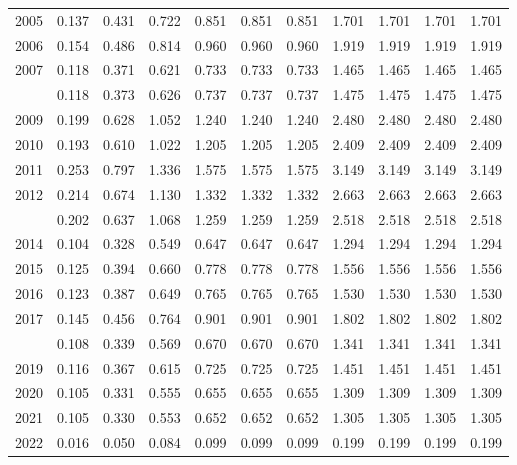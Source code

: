 \documentclass[
]{article}
\begin{document}
\begin{longtable}[t]{lrrrrrrrrrr}
2005 & 0.137 & 0.431 & 0.722 & 0.851 & 0.851 & 0.851 & 1.701 & 1.701 & 1.701 & 1.701\\
2006 & 0.154 & 0.486 & 0.814 & 0.960 & 0.960 & 0.960 & 1.919 & 1.919 & 1.919 & 1.919\\
2007 & 0.118 & 0.371 & 0.621 & 0.733 & 0.733 & 0.733 & 1.465 & 1.465 & 1.465 & 1.465\\
\addlinespace
2008 & 0.118 & 0.373 & 0.626 & 0.737 & 0.737 & 0.737 & 1.475 & 1.475 & 1.475 & 1.475\\
2009 & 0.199 & 0.628 & 1.052 & 1.240 & 1.240 & 1.240 & 2.480 & 2.480 & 2.480 & 2.480\\
2010 & 0.193 & 0.610 & 1.022 & 1.205 & 1.205 & 1.205 & 2.409 & 2.409 & 2.409 & 2.409\\
2011 & 0.253 & 0.797 & 1.336 & 1.575 & 1.575 & 1.575 & 3.149 & 3.149 & 3.149 & 3.149\\
2012 & 0.214 & 0.674 & 1.130 & 1.332 & 1.332 & 1.332 & 2.663 & 2.663 & 2.663 & 2.663\\
\addlinespace
2013 & 0.202 & 0.637 & 1.068 & 1.259 & 1.259 & 1.259 & 2.518 & 2.518 & 2.518 & 2.518\\
2014 & 0.104 & 0.328 & 0.549 & 0.647 & 0.647 & 0.647 & 1.294 & 1.294 & 1.294 & 1.294\\
2015 & 0.125 & 0.394 & 0.660 & 0.778 & 0.778 & 0.778 & 1.556 & 1.556 & 1.556 & 1.556\\
2016 & 0.123 & 0.387 & 0.649 & 0.765 & 0.765 & 0.765 & 1.530 & 1.530 & 1.530 & 1.530\\
2017 & 0.145 & 0.456 & 0.764 & 0.901 & 0.901 & 0.901 & 1.802 & 1.802 & 1.802 & 1.802\\
\addlinespace
2018 & 0.108 & 0.339 & 0.569 & 0.670 & 0.670 & 0.670 & 1.341 & 1.341 & 1.341 & 1.341\\
2019 & 0.116 & 0.367 & 0.615 & 0.725 & 0.725 & 0.725 & 1.451 & 1.451 & 1.451 & 1.451\\
2020 & 0.105 & 0.331 & 0.555 & 0.655 & 0.655 & 0.655 & 1.309 & 1.309 & 1.309 & 1.309\\
2021 & 0.105 & 0.330 & 0.553 & 0.652 & 0.652 & 0.652 & 1.305 & 1.305 & 1.305 & 1.305\\
2022 & 0.016 & 0.050 & 0.084 & 0.099 & 0.099 & 0.099 & 0.199 & 0.199 & 0.199 & 0.199\\*
\end{longtable}
\end{document}
